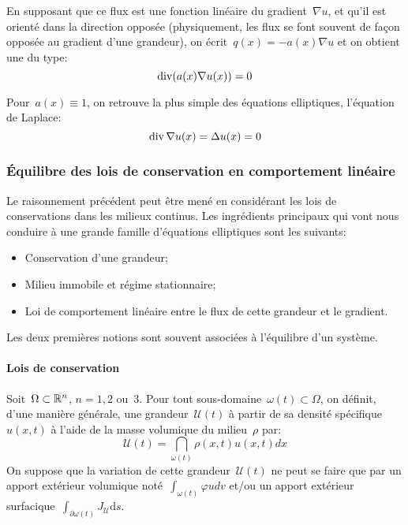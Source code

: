En supposant que ce flux est une fonction linéaire du gradient~$\nabla u$, et qu'il est orienté dans la direction opposée (physiquement, les flux se font souvent de façon opposée au gradient d'une grandeur), on écrit~$q(x) = -a(x)\nabla u$ et on obtient une  du type:
\begin{equation}\operatorname{div}(a(x)\nabla u(x)) = 0\end{equation}

Pour~$a(x) \equiv 1$, on retrouve la plus simple des équations elliptiques, l'équation de Laplace:
\begin{equation}\operatorname{div}\nabla u(x) = \Delta u(x) = 0\end{equation}

\medskip
\subsubsection{Équilibre des lois de conservation en comportement linéaire}
Le raisonnement précédent peut être mené en considérant les lois de conservations dans les milieux continus. Les ingrédients principaux qui vont nous conduire à une grande famille d'équations elliptiques sont les suivants:
\begin{itemize}
  \item Conservation d'une grandeur;
  \item Milieu immobile et régime stationnaire;
  \item Loi de comportement linéaire entre le flux de cette grandeur et le gradient.
\end{itemize}
Les deux premières notions sont souvent associées à l'équilibre d'un système.

\medskip
\paragraph{Lois de conservation}
Soit~$\Omega\subset\mathbb R^n$, $n=1, 2$ ou~$3$.
Pour tout sous-domaine~$\omega(t)\subset\Omega$, on définit, d'une manière générale, une grandeur~$\mathcal{U}(t)$ à partir de sa densité spécifique $u(x,t)$ à l'aide de la masse volumique du milieu~$\rho$ par:
\begin{equation}\mathcal{U}(t)=\dint_{\omega(t)} \rho(x,t)u(x,t)dx\end{equation}
On suppose que la variation de cette grandeur~$\mathcal{U}(t)$ ne peut se faire que par un apport extérieur volumique noté~$\int_{\omega(t)} \varphi u dv$ et/ou un apport extérieur surfacique~$\int_{\partial\omega(t)} J_{\mathcal{U}} \mathrm ds$.

